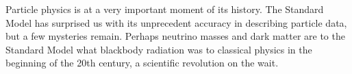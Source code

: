 Particle physics is at a very important moment of its history. The Standard Model has surprised us with its unprecedent accuracy in describing particle data, but a few mysteries remain. Perhaps neutrino masses and dark matter are to the Standard Model what blackbody radiation was to classical physics in the beginning of the 20th century, a scientific revolution on the wait. 
